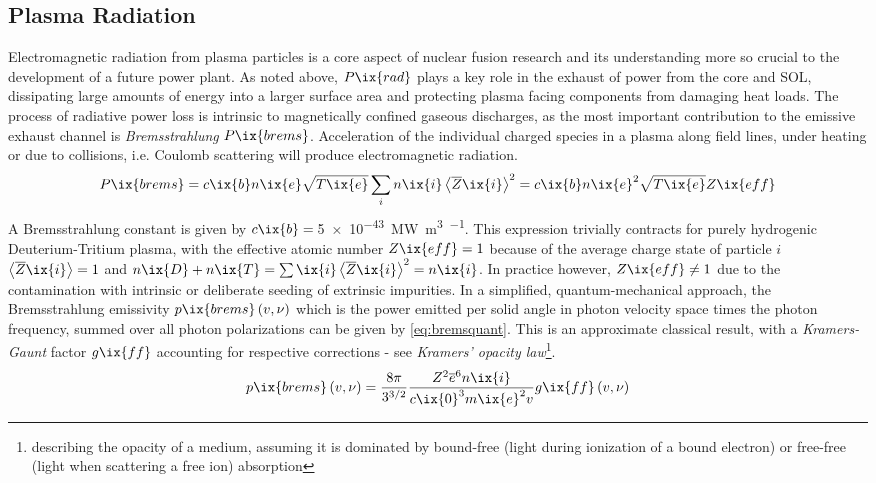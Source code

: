         \subsection{Plasma Radiation}\label{subsec:radiation}%
%
            Electromagnetic radiation from plasma particles is a core aspect of nuclear fusion research and its understanding more so crucial to the development of a future power plant. As noted above, $P\ix{rad}$ plays a key role in the exhaust of power from the core and SOL, dissipating large amounts of energy into a larger surface area and protecting plasma facing components from damaging heat loads. The process of radiative power loss is intrinsic to magnetically confined gaseous discharges, as the most important contribution to the emissive exhaust channel is \textit{Bremsstrahlung} $P\ix{brems}$. Acceleration of the individual charged species in a plasma along field lines, under heating or due to collisions, i.e. Coulomb scattering will produce electromagnetic radiation.%
%
            \begin{align}%
                P\ix{brems}=c\ix{b}n\ix{e}\sqrt{T\ix{e}}\sum_{i}n\ix{i}\left\langle\overline{Z}\ix{i}\right\rangle^{2}=c\ix{b}n\ix{e}^{2}\sqrt{T\ix{e}}Z\ix{eff}\label{eq:brems}%
            \end{align}%
%
            A Bremsstrahlung constant is given by $c\ix{b}=\,$\SI{5e-43}{\mega\watt\cubic\meter\per\sqrt{\kilo\electronvolt}}\cite{Meade1974}. This expression trivially contracts for purely hydrogenic Deuterium-Tritium plasma, with the effective atomic number $Z\ix{eff}=1$ because of the average charge state of particle $i$ $\left\langle\overline{Z}\ix{i}\right\rangle=1$ and $n\ix{D}+n\ix{T}=\sum\ix{i}\left\langle\overline{Z}\ix{i}\right\rangle^{2}=n\ix{i}$. In practice however, $Z\ix{eff}\neq1$ due to the contamination with intrinsic or deliberate seeding of extrinsic impurities. In a simplified, quantum-mechanical approach, the Bremsstrahlung emissivity $p\ix{brems}\left(v,\nu\right)$ which is the power emitted per solid angle in photon velocity space times the photon frequency, summed over all photon polarizations can be given by \cref{eq:bremsquant}. This is an approximate classical result, with a \textit{Kramers-Gaunt} factor $g\ix{ff}$ accounting for respective corrections - see \textit{Kramers' opacity law}\footnote[1]{describing the opacity of a medium, assuming it is dominated by bound-free (light during ionization of a bound electron) or free-free (light when scattering a free ion) absorption}.%
%
            \begin{align}%
                p\ix{brems}\left(v,\nu\right)=\frac{8\pi}{3^{3/2}}\frac{Z^{2}\overline{e}^{6}n\ix{i}}{c\ix{0}^{3}m\ix{e}^{2}v}g\ix{ff}\left(v,\nu\right)\label{eq:bremsquant}%
            \end{align}%
